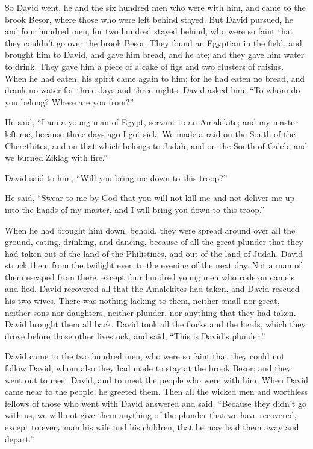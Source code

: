  So David went, he and the six hundred men who were with
him, and came to the brook Besor, where those who were left behind
stayed.  But David pursued, he and four hundred men; for
two hundred stayed behind, who were so faint that they couldn't go over
the brook Besor.  They found an Egyptian in the field,
and brought him to David, and gave him bread, and he ate; and they gave
him water to drink.  They gave him a piece of a cake of
figs and two clusters of raisins. When he had eaten, his spirit came
again to him; for he had eaten no bread, and drank no water for three
days and three nights.  David asked him, ``To whom do you
belong? Where are you from?''

He said, ``I am a young man of Egypt, servant to an Amalekite; and my
master left me, because three days ago I got sick.  We
made a raid on the South of the Cherethites, and on that which belongs
to Judah, and on the South of Caleb; and we burned Ziklag with fire.''

 David said to him, ``Will you bring me down to this
troop?''

He said, ``Swear to me by God that you will not kill me and not deliver
me up into the hands of my master, and I will bring you down to this
troop.''

 When he had brought him down, behold, they were spread
around over all the ground, eating, drinking, and dancing, because of
all the great plunder that they had taken out of the land of the
Philistines, and out of the land of Judah.  David struck
them from the twilight even to the evening of the next day. Not a man of
them escaped from there, except four hundred young men who rode on
camels and fled.  David recovered all that the Amalekites
had taken, and David rescued his two wives.  There was
nothing lacking to them, neither small nor great, neither sons nor
daughters, neither plunder, nor anything that they had taken. David
brought them all back.  David took all the flocks and the
herds, which they drove before those other livestock, and said, ``This
is David's plunder.''

 David came to the two hundred men, who were so faint
that they could not follow David, whom also they had made to stay at the
brook Besor; and they went out to meet David, and to meet the people who
were with him. When David came near to the people, he greeted them.
 Then all the wicked men and worthless fellows of those
who went with David answered and said, ``Because they didn't go with us,
we will not give them anything of the plunder that we have recovered,
except to every man his wife and his children, that he may lead them
away and depart.''


